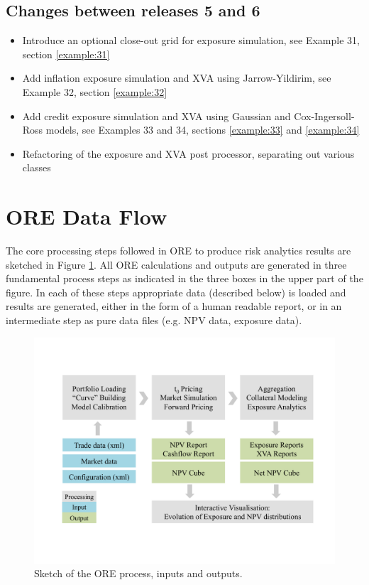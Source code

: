 \documentclass[12pt, a4paper]{article}
\begin{document}
\subsection*{Changes between releases 5 and 6}

\begin{itemize}
\item Introduce an optional close-out grid for exposure simulation, see Example 31, section \ref{example:31}
\item Add inflation exposure simulation and XVA using Jarrow-Yildirim, see Example 32, section \ref{example:32}
\item Add credit exposure simulation and XVA using Gaussian and Cox-Ingersoll-Ross models, see Examples 33 and 34, sections \ref{example:33} and \ref{example:34}
\item Refactoring of the exposure and XVA post processor, separating out various classes  
\end{itemize}

\section{ORE Data Flow}\label{sec:process}

The core processing steps followed in ORE to produce risk analytics results are sketched in Figure \ref{fig_process}.
All ORE calculations and outputs are generated in three fundamental process steps as indicated in the three boxes in the
upper part of the figure. In each of these steps appropriate data (described below) is loaded and results are generated,
either in the form of a human readable report, or in an intermediate step as pure data files (e.g. NPV data, exposure data).
\begin{figure}[h]
\begin{center}
\includegraphics[scale=0.6]{process.pdf}
\end{center}
\caption{Sketch of the ORE process, inputs and outputs. }
\label{fig_process}
\end{figure}
\end{document}

